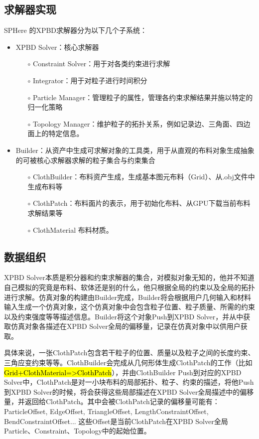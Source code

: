 \subsection{求解器实现}
SPHere 的XPBD求解器分为以下几个子系统：
\begin{itemize}
	\item XPBD Solver：核心求解器
	      \begin{itemize}
		      \item[$\circ$] Constraint Solver：用于对各类约束进行求解
		      \item[$\circ$] Integrator：用于对粒子进行时间积分
		      \item[$\circ$] Particle Manager：管理粒子的属性，管理各约束求解结果并施以特定的归一化策略
		      \item[$\circ$] Topology Manager：维护粒子的拓扑关系，例如记录边、三角面、四边面上的特定信息。
	      \end{itemize}
	\item Builder：从资产中生成可求解对象的工具类，用于从直观的布料对象生成抽象的可被核心求解器求解的粒子集合与约束集合
	      \begin{itemize}
		      \item[$\circ$] ClothBuilder：布料资产生成，生成基本图元布料（Grid）、从.obj文件中生成布料等
		      \item[$\circ$] ClothPatch：布料面片的表示，用于初始化布料、从GPU下载当前布料求解结果等
		      \item[$\circ$] ClothMaterial 布料材质。
	      \end{itemize}
\end{itemize}


\subsection{数据组织}
XPBD Solver本质是积分器和约束求解器的集合，对模拟对象无知的，他并不知道自己模拟的究竟是布料、软体还是别的什么，他只根据全局的约束以及全局的拓扑进行求解。仿真对象的构建由Builder完成，Builder将会根据用户几何输入和材料输入生成一个仿真对象，这个仿真对象中会包含粒子位置、粒子质量、所需的约束以及约束强度等等描述信息。Builder将这个对象Push到XPBD Solver，并从中获取仿真对象各描述在XPBD Solver全局的偏移量，记录在仿真对象中以供用户获取。

具体来说，一张ClothPatch包含若干粒子的位置、质量以及粒子之间的长度约束、三角应变约束等等。ClothBuilder会完成从几何形体生成ClothPatch的工作（比如\hl{Grid+ClothMaterial=\textgreater ClothPatch}），并由ClothBuilder Push到对应的XPBD Solver中，ClothPatch是对一小块布料的局部拓扑、粒子、约束的描述，将他Push到XPBD Solver的时候，将会获得这些局部描述在XPBD Solver全局描述中的偏移量，并返回给ClothPatch。其中会被ClothPatch记录的偏移量可能有：ParticleOffset, EdgeOffset, TriangleOffset, LengthConstraintOffset, BendConstraintOffset... 这些Offset是当前ClothPatch在XPBD Solver全局Particle、Constraint、Topology中的起始位置。

